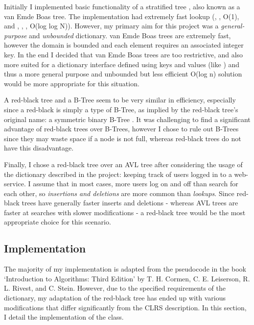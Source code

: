 Initially I implemented basic functionality of a stratified tree \cite{stratified}, also known as a van Emde Boas tree. The implementation had extremely fast lookup (, ,  O(1), and , , ,  O(log log N)). However, my primary aim for this project was a \textit{general-purpose} and \textit{unbounded} dictionary. van Emde Boas trees are extremely fast, however the domain is bounded and each element requires an associated integer key. In the end I decided that van Emde Boas trees are too restrictive, and also more suited for a dictionary interface defined using keys and values (like ) and thus a more general purpose and unbounded but less efficient O(log n) solution would be more appropriate for this situation.

A red-black tree and a B-Tree seem to be very similar in efficiency, especially since a red-black is simply a type of B-Tree, as implied by the red-black tree's original name: a symmetric binary B-Tree \cite{bayer}. It was challenging to find a significant advantage of red-black trees over B-Trees, however I chose to rule out B-Trees since they may waste space if a node is not full, whereas red-black trees do not have this disadvantage.

Finally, I chose a red-black tree over an AVL tree after considering the usage of the dictionary described in the project: keeping track of users logged in to a web-service. I assume that in most cases, more users log on and off than search for each other, so \textit{insertions and deletions} are more common than \textit{lookups}. Since red-black trees have generally faster inserts and deletions \cite{clrs} - whereas AVL trees are faster at searches with slower modifications - a red-black tree would be the most appropriate choice for this scenario.

\subsection{Implementation}

The majority of my implementation is adapted from the pseudocode in the book `Introduction to Algorithms: Third Edition' by T. H. Cormen, C. E. Leiserson, R. L. Rivest, and C. Stein. However, due to the specified requirements of the dictionary, my adaptation of the red-black tree has ended up with various modifications that differ significantly from the CLRS description. In this section, I detail the implementation of the  class.

